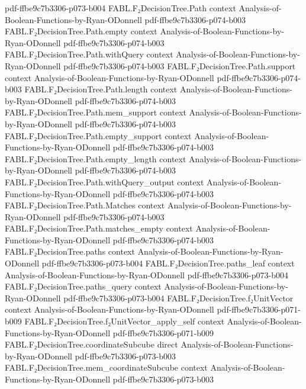 \begin{theorem}
  {pdf-ffbe9c7b3306-p073-b004}
\proofstep
  {FABL.F₂DecisionTree.Path}
  {context}
  {Analysis-of-Boolean-Functions-by-Ryan-ODonnell}
  {pdf-ffbe9c7b3306-p074-b003}
\proofstep
  {FABL.F₂DecisionTree.Path.empty}
  {context}
  {Analysis-of-Boolean-Functions-by-Ryan-ODonnell}
  {pdf-ffbe9c7b3306-p074-b003}
\proofstep
  {FABL.F₂DecisionTree.Path.withQuery}
  {context}
  {Analysis-of-Boolean-Functions-by-Ryan-ODonnell}
  {pdf-ffbe9c7b3306-p074-b003}
\proofstep
  {FABL.F₂DecisionTree.Path.support}
  {context}
  {Analysis-of-Boolean-Functions-by-Ryan-ODonnell}
  {pdf-ffbe9c7b3306-p074-b003}
\proofstep
  {FABL.F₂DecisionTree.Path.length}
  {context}
  {Analysis-of-Boolean-Functions-by-Ryan-ODonnell}
  {pdf-ffbe9c7b3306-p074-b003}
\proofstep
  {FABL.F₂DecisionTree.Path.mem_support}
  {context}
  {Analysis-of-Boolean-Functions-by-Ryan-ODonnell}
  {pdf-ffbe9c7b3306-p074-b003}
\proofstep
  {FABL.F₂DecisionTree.Path.empty_support}
  {context}
  {Analysis-of-Boolean-Functions-by-Ryan-ODonnell}
  {pdf-ffbe9c7b3306-p074-b003}
\proofstep
  {FABL.F₂DecisionTree.Path.empty_length}
  {context}
  {Analysis-of-Boolean-Functions-by-Ryan-ODonnell}
  {pdf-ffbe9c7b3306-p074-b003}
\proofstep
  {FABL.F₂DecisionTree.Path.withQuery_output}
  {context}
  {Analysis-of-Boolean-Functions-by-Ryan-ODonnell}
  {pdf-ffbe9c7b3306-p074-b003}
\proofstep
  {FABL.F₂DecisionTree.Path.Matches}
  {context}
  {Analysis-of-Boolean-Functions-by-Ryan-ODonnell}
  {pdf-ffbe9c7b3306-p074-b003}
\proofstep
  {FABL.F₂DecisionTree.Path.matches_empty}
  {context}
  {Analysis-of-Boolean-Functions-by-Ryan-ODonnell}
  {pdf-ffbe9c7b3306-p074-b003}
\proofstep
  {FABL.F₂DecisionTree.paths}
  {context}
  {Analysis-of-Boolean-Functions-by-Ryan-ODonnell}
  {pdf-ffbe9c7b3306-p073-b004}
\proofstep
  {FABL.F₂DecisionTree.paths_leaf}
  {context}
  {Analysis-of-Boolean-Functions-by-Ryan-ODonnell}
  {pdf-ffbe9c7b3306-p073-b004}
\proofstep
  {FABL.F₂DecisionTree.paths_query}
  {context}
  {Analysis-of-Boolean-Functions-by-Ryan-ODonnell}
  {pdf-ffbe9c7b3306-p073-b004}
\proofstep
  {FABL.F₂DecisionTree.f₂UnitVector}
  {context}
  {Analysis-of-Boolean-Functions-by-Ryan-ODonnell}
  {pdf-ffbe9c7b3306-p071-b009}
\proofstep
  {FABL.F₂DecisionTree.f₂UnitVector_apply_self}
  {context}
  {Analysis-of-Boolean-Functions-by-Ryan-ODonnell}
  {pdf-ffbe9c7b3306-p071-b009}
\proofstep
  {FABL.F₂DecisionTree.coordinateSubcube}
  {direct}
  {Analysis-of-Boolean-Functions-by-Ryan-ODonnell}
  {pdf-ffbe9c7b3306-p073-b003}
\proofstep
  {FABL.F₂DecisionTree.mem_coordinateSubcube}
  {context}
  {Analysis-of-Boolean-Functions-by-Ryan-ODonnell}
  {pdf-ffbe9c7b3306-p073-b003}

\end{theorem}
